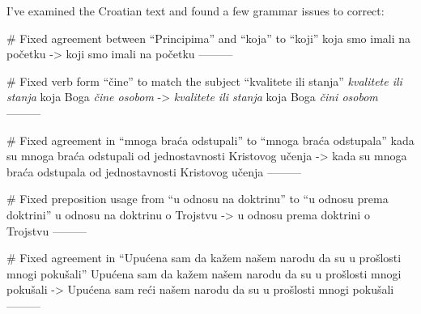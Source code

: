 I've examined the Croatian text and found a few grammar issues to correct:

# Fixed agreement between “Principima” and “koja” to “koji”
 koja smo imali na početku
->
 koji smo imali na početku
---------

# Fixed verb form “čine” to match the subject “kvalitete ili stanja”
\textit{kvalitete ili stanja} koja Boga \textit{čine osobom}
->
\textit{kvalitete ili stanja} koja Boga \textit{čini osobom}
---------

# Fixed agreement in “mnoga braća odstupali” to “mnoga braća odstupala”
kada su mnoga braća odstupali od jednostavnosti Kristovog učenja
->
kada su mnoga braća odstupala od jednostavnosti Kristovog učenja
---------

# Fixed preposition usage from “u odnosu na doktrinu” to “u odnosu prema doktrini”
u odnosu na doktrinu o Trojstvu
->
u odnosu prema doktrini o Trojstvu
---------

# Fixed agreement in “Upućena sam da kažem našem narodu da su u prošlosti mnogi pokušali”
Upućena sam da kažem našem narodu da su u prošlosti mnogi pokušali
->
Upućena sam reći našem narodu da su u prošlosti mnogi pokušali
---------